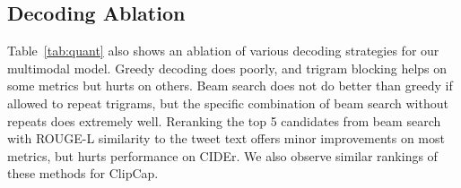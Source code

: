 \documentclass{article} %
\begin{document}
\begin{table}
    \centering
    \begin{minipage}[c]{0.47\linewidth}
    \end{minipage} \hfill
    \begin{minipage}[c]{0.51\linewidth}
    \end{minipage}
    \caption{\textbf{Left:} Results from human evaluation, showing annotator preference for our model vs. frozen ClipCap in terms of fluency and descriptiveness. \textbf{Right:} Results showing annotator preference for our model vs. finetuned ClipCap in terms of fluency and descriptiveness.}
    \label{tab:human}
\end{table}


\subsection{Decoding Ablation}

Table~\ref{tab:quant} also shows an ablation of various decoding strategies for our multimodal model.
Greedy decoding does poorly, and trigram blocking helps on some metrics but hurts on others.
Beam search does not do better than greedy if allowed to repeat trigrams, but the specific combination of beam search without repeats does extremely well.
Reranking the top 5 candidates from beam search with ROUGE-L similarity to the tweet text offers minor improvements on most metrics, but hurts performance on CIDEr.
We also observe similar rankings of these methods for ClipCap.
\end{document}
